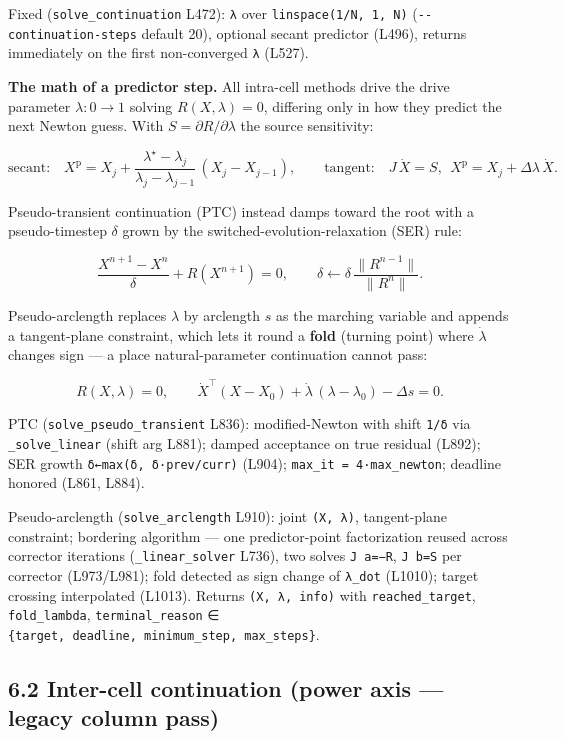 \documentclass[
  10pt,
]{article}
\begin{document}
Fixed (\texttt{solve\_continuation} L472): \texttt{λ} over
\texttt{linspace(1/N,\ 1,\ N)} (\texttt{-\/-continuation-steps} default
20), optional secant predictor (L496), returns immediately on the first
non-converged \texttt{λ} (L527).

\textbf{The math of a predictor step.} All intra-cell methods drive the
drive parameter \(\lambda:0\to1\) solving \(R(X,\lambda)=0\), differing
only in how they predict the next Newton guess. With
\(S=\partial R/\partial\lambda\) the source sensitivity:

\[
\text{secant:}\quad X^{\mathrm{p}} = X_j + \frac{\lambda^\star-\lambda_j}{\lambda_j-\lambda_{j-1}}\,(X_j - X_{j-1}),
\qquad
\text{tangent:}\quad J\,\dot X = S,\ \ X^{\mathrm{p}} = X_j + \Delta\lambda\,\dot X .
\]

Pseudo-transient continuation (PTC) instead damps toward the root with a
pseudo-timestep \(\delta\) grown by the switched-evolution-relaxation
(SER) rule:

\[
\frac{X^{n+1}-X^{n}}{\delta} + R(X^{n+1}) = 0,
\qquad
\delta \leftarrow \delta\,\frac{\lVert R^{n-1}\rVert}{\lVert R^{n}\rVert}.
\]

Pseudo-arclength replaces \(\lambda\) by arclength \(s\) as the marching
variable and appends a tangent-plane constraint, which lets it round a
\textbf{fold} (turning point) where \(\dot\lambda\) changes sign --- a
place natural-parameter continuation cannot pass:

\[
R(X,\lambda)=0,\qquad
\dot X^{\top}(X-X_0) + \dot\lambda\,(\lambda-\lambda_0) - \Delta s = 0 .
\]

PTC (\texttt{solve\_pseudo\_transient} L836): modified-Newton with shift
\texttt{1/δ} via \texttt{\_solve\_linear} (shift arg L881); damped
acceptance on true residual (L892); SER growth
\texttt{δ←max(δ,\ δ·prev/curr)} (L904);
\texttt{max\_it\ =\ 4·max\_newton}; deadline honored (L861, L884).

Pseudo-arclength (\texttt{solve\_arclength} L910): joint
\texttt{(X,\ λ)}, tangent-plane constraint; bordering algorithm --- one
predictor-point factorization reused across corrector iterations
(\texttt{\_linear\_solver} L736), two solves \texttt{J\ a=−R},
\texttt{J\ b=S} per corrector (L973/L981); fold detected as sign change
of \texttt{λ\_dot} (L1010); target crossing interpolated (L1013).
Returns \texttt{(X,\ λ,\ info)} with \texttt{reached\_target},
\texttt{fold\_lambda}, \texttt{terminal\_reason} ∈
\texttt{\{target,\ deadline,\ minimum\_step,\ max\_steps\}}.

\subsection{6.2 Inter-cell continuation (power axis --- legacy column
pass)}\label{inter-cell-continuation-power-axis-legacy-column-pass}
\end{document}

